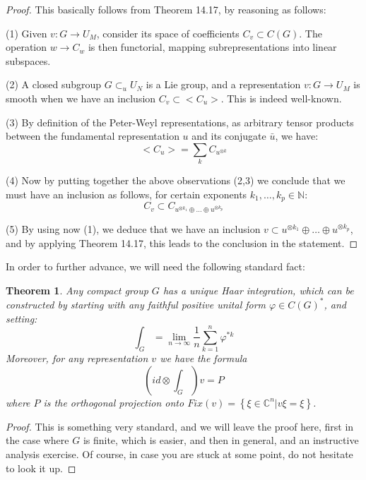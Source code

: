 \documentclass[12pt]{amsbook}
\newtheorem{theorem}{Theorem}[chapter]
\begin{document}
\begin{proof}
This basically follows from Theorem 14.17, by reasoning as follows:

\medskip

(1) Given $v:G\to U_M$, consider its space of coefficients $C_v\subset C(G)$. The operation $w\to C_w$ is then functorial, mapping subrepresentations into linear subspaces.

\medskip

(2) A closed subgroup $G\subset_uU_N$ is a Lie group, and a representation $v:G\to U_M$ is smooth when we have an inclusion $C_v\subset<C_u>$. This is indeed well-known.

\medskip

(3) By definition of the Peter-Weyl representations, as arbitrary tensor products between the fundamental representation $u$ and its conjugate $\bar{u}$, we have:
$$<C_u>=\sum_kC_{u^{\otimes k}}$$

(4) Now by putting together the above observations (2,3) we conclude that we must have an inclusion as follows, for certain exponents $k_1,\ldots,k_p\in\mathbb N$:
$$C_v\subset C_{u^{\otimes k_1}\oplus\ldots\oplus u^{\otimes k_p}}$$

(5) By using now (1), we deduce that we have an inclusion $v\subset u^{\otimes k_1}\oplus\ldots\oplus u^{\otimes k_p}$, and by applying Theorem 14.17, this leads to the conclusion in the statement.
\end{proof}

In order to further advance, we will need the following standard fact:


\begin{theorem}
Any compact group $G$ has a unique Haar integration, which can be constructed by starting with any faithful positive unital form $\varphi\in C(G)^*$, and setting:
$$\int_G=\lim_{n\to\infty}\frac{1}{n}\sum_{k=1}^n\varphi^{*k}$$
Moreover, for any representation $v$ we have the formula
$$\left(id\otimes\int_G\right)v=P$$
where $P$ is the orthogonal projection onto $Fix(v)=\left\{\xi\in\mathbb C^n\big|v\xi=\xi\right\}$.
\end{theorem}

\begin{proof}
This is something very standard, and we will leave the proof here, first in the case where $G$ is finite, which is easier, and then in general, and an instructive analysis exercise. Of course, in case you are stuck at some point, do not hesitate to look it up.
\end{proof}
\end{document}
